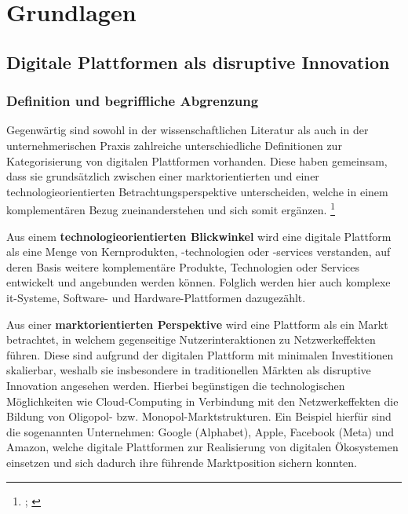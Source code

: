 \chapter{Grundlagen}

\section{Digitale Plattformen als disruptive Innovation}

\subsection{Definition und begriffliche Abgrenzung}

Gegenwärtig sind sowohl in der wissenschaftlichen Literatur als auch in der unternehmerischen Praxis zahlreiche unterschiedliche Definitionen zur Kategorisierung von digitalen Plattformen vorhanden. Diese haben gemeinsam, dass sie grundsätzlich zwischen einer marktorientierten und einer technologieorientierten Betrachtungsperspektive unterscheiden, welche in einem komplementären Bezug zueinanderstehen und sich somit ergänzen. \footnote{\cites[Vgl.][S. 21-23]{ENGELS2017}; \cites[Vgl.][S.99]{MEINHARDT2019}}



Aus einem \textbf{technologieorientierten Blickwinkel} wird eine digitale Plattform als eine Menge von Kernprodukten, -technologien oder -services verstanden, auf deren Basis weitere komplementäre Produkte, Technologien oder Services entwickelt und angebunden werden können.\autocite[Vgl.][S. 21]{ENGELS2017} Folglich werden hier auch komplexe \acs{it}-Systeme, Software- und Hardware-Plattformen dazugezählt.\autocite[Vgl.][S.222f]{WEINREICH2016}

Aus einer \textbf{marktorientierten Perspektive} wird eine Plattform als ein Markt betrachtet, in welchem gegenseitige Nutzerinteraktionen zu Netzwerkeffekten führen. \autocite[Vgl.][S. 1273f]{EISENMANN2011} Diese sind aufgrund der digitalen Plattform mit minimalen Investitionen skalierbar, weshalb sie insbesondere in traditionellen Märkten als disruptive Innovation angesehen werden. \autocite[Vgl.][S. 17ff]{MOAZED2016} Hierbei begünstigen die technologischen Möglichkeiten wie Cloud-Computing in Verbindung mit den Netzwerkeffekten die Bildung von Oligopol- bzw. Monopol-Marktstrukturen.\autocite[Vgl.][S. 23]{ENGELS2017} Ein Beispiel hierfür sind die sogenannten  Unternehmen: Google (Alphabet), Apple, Facebook (Meta) und Amazon, welche digitale Plattformen zur Realisierung von digitalen Ökosystemen einsetzen und sich dadurch ihre führende Marktposition sichern konnten. \autocite[Vgl.][S. 92f]{BUNTE2020} 


